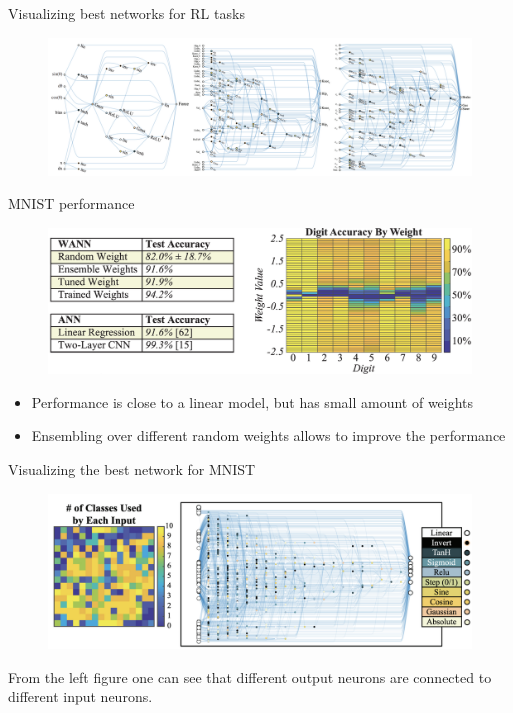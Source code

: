 \documentclass[handout, 10pt]{beamer}
\begin{document}
\begin{frame}{Visualizing best networks for RL tasks}
    \begin{figure}
        \centering
        \includegraphics[width=\textwidth]{images/champion-networks-for-cc-tasks.png}
    \end{figure}
\end{frame}


\begin{frame}{MNIST performance}
    \begin{figure}
        \centering
        \includegraphics[width=\textwidth]{images/mnist-performance.png}
    \end{figure}
    
    \begin{itemize}
        \item\pause Performance is close to a linear model, but has small amount of weights
        \item\pause Ensembling over different random weights allows to improve the performance
    \end{itemize}
\end{frame}


\begin{frame}{Visualizing the best network for MNIST}
    \begin{figure}
        \centering
        \includegraphics[width=\textwidth]{images/wann-mnist-visualization.png}
    \end{figure}
    From the left figure one can see that different output neurons are connected to different input neurons.
\end{frame}
\end{document}
